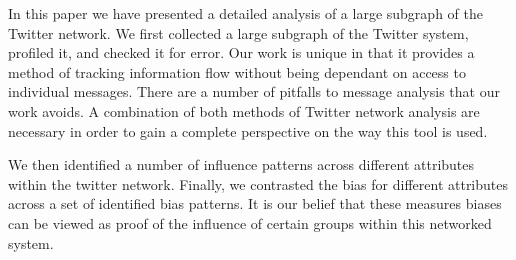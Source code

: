 In this paper we have presented a detailed analysis of a large subgraph of the Twitter network.  We first collected a large subgraph of the Twitter system, profiled it, and checked it for error.  Our work is unique in that it provides a method of tracking information flow without being dependant on access to individual messages.  There are a number of pitfalls to message analysis that our work avoids.  A combination of both methods of Twitter network analysis are necessary in order to gain a complete perspective on the way this tool is 
used.

We then identified a number of influence patterns across different attributes within the twitter network.  Finally, we contrasted the bias for different attributes across a set of identified bias patterns.  It is our belief that these measures biases can be viewed as proof of the influence of certain groups within this networked system.